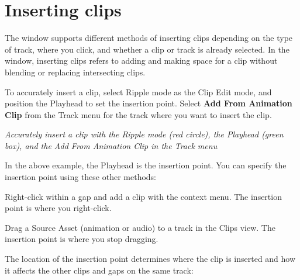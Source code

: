 \chapter{Inserting clips}
\hypertarget{md__library_2_package_cache_2com_8unity_8timeline_0d1_87_86_2_documentation_0i_2clp__insert}{}\label{md__library_2_package_cache_2com_8unity_8timeline_0d1_87_86_2_documentation_0i_2clp__insert}
\label{md__library_2_package_cache_2com_8unity_8timeline_0d1_87_86_2_documentation_0i_2clp__insert_autotoc_md1115}%
%
 The  window supports different methods of inserting clips depending on the type of track, where you click, and whether a clip or track is already selected. In the  window, inserting clips refers to adding and making space for a clip without blending or replacing intersecting clips.

To accurately insert a clip, select Ripple mode as the Clip Edit mode, and position the  Playhead to set the insertion point. Select {\bfseries{Add From Animation Clip}} from the Track menu for the track where you want to insert the clip.



{\itshape Accurately insert a clip with the Ripple mode (red circle), the  Playhead (green box), and the Add From Animation Clip in the Track menu}

In the above example, the  Playhead is the insertion point. You can specify the insertion point using these other methods\+:


\begin{DoxyItemize}
\item Right-\/click within a gap and add a clip with the context menu. The insertion point is where you right-\/click.
\item Drag a Source Asset (animation or audio) to a track in the Clips view. The insertion point is where you stop dragging.
\end{DoxyItemize}

The location of the insertion point determines where the clip is inserted and how it affects the other clips and gaps on the same track\+:



